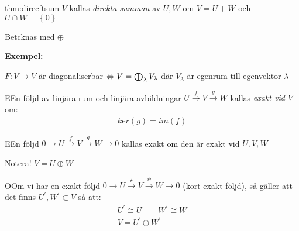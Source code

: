 \par\bigskip
\begin{theo}{thm:direcftsum}
$V$ kallas \textit{direkta summan} av $U,W$ om $V = U+W$ och $U\cap W = \left\{0\right\}$
\par\bigskip
\noindent Betcknas med $\oplus$
\end{theo}
\par\bigskip
\noindent\textbf{Exempel:}\par
\noindent $F:V\to V$ är diagonaliserbar $\Leftrightarrow V = \bigoplus_{\lambda}V_{\lambda}$ där $V_{\lambda}$ är egenrum till egenvektor $\lambda$
\par\bigskip
\begin{theo}
  EEn följd av linjära rum och linjära avbildningar $U\stackrel{f}{\to}V\stackrel{g}{\to}W$ kallas \textit{exakt vid $V$} om:
  \begin{equation*}
    \begin{gathered}
      ker(g) = im(f)
    \end{gathered}
  \end{equation*}
\end{theo}
\par\bigskip
\begin{theo}
  EEn följd $0\to U\stackrel{f}{\to}V\stackrel{g}{\to}W\to 0$ kallas exakt om den är exakt vid $U,V,W$
  \par\bigskip
  \noindent Notera! $V = U\oplus W$
\end{theo}
\par\bigskip
\begin{theo}
  OOm vi har en exakt följd $0\to U\stackrel{\varphi}{\to}V\stackrel{\psi}{\to}W\to 0$ (kort exakt följd), så gäller att det finns $U^{\prime},W^{\prime}\subset V$  så att:
  \begin{equation*}
    \begin{gathered}
      U^{\prime}\cong U\qquad W^{\prime}\cong W\\
      V = U^{\prime}\oplus W^{\prime}
    \end{gathered}
  \end{equation*}
\end{theo}
\newpage
